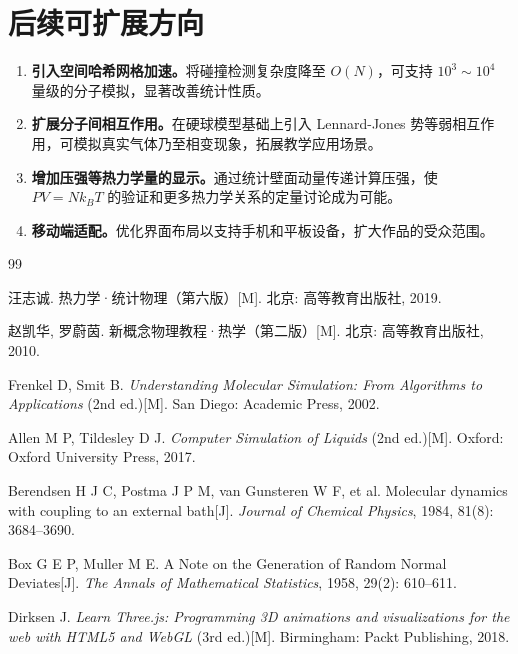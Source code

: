 \documentclass[zihao=-4,a4paper,oneside]{ctexbook}
\newcommand{\kb}{k_{\!B}}
\begin{document}
\section{后续可扩展方向}

\begin{enumerate}
  \item \textbf{引入空间哈希网格加速。}将碰撞检测复杂度降至 $O(N)$，可支持 $10^3\sim 10^4$ 量级的分子模拟，显著改善统计性质。
  \item \textbf{扩展分子间相互作用。}在硬球模型基础上引入 Lennard-Jones 势等弱相互作用，可模拟真实气体乃至相变现象，拓展教学应用场景。
  \item \textbf{增加压强等热力学量的显示。}通过统计壁面动量传递计算压强，使 $PV=N\kb T$ 的验证和更多热力学关系的定量讨论成为可能。
  \item \textbf{移动端适配。}优化界面布局以支持手机和平板设备，扩大作品的受众范围。
\end{enumerate}

\begin{thebibliography}{99}

 汪志诚. 热力学·统计物理（第六版）[M]. 北京: 高等教育出版社, 2019.

 赵凯华, 罗蔚茵. 新概念物理教程·热学（第二版）[M]. 北京: 高等教育出版社, 2010.

 Frenkel D, Smit B. \textit{Understanding Molecular Simulation: From Algorithms to Applications} (2nd ed.)[M]. San Diego: Academic Press, 2002.

 Allen M P, Tildesley D J. \textit{Computer Simulation of Liquids} (2nd ed.)[M]. Oxford: Oxford University Press, 2017.

 Berendsen H J C, Postma J P M, van Gunsteren W F, et al. Molecular dynamics with coupling to an external bath[J]. \textit{Journal of Chemical Physics}, 1984, 81(8): 3684--3690.

 Box G E P, Muller M E. A Note on the Generation of Random Normal Deviates[J]. \textit{The Annals of Mathematical Statistics}, 1958, 29(2): 610--611.

 Dirksen J. \textit{Learn Three.js: Programming 3D animations and visualizations for the web with HTML5 and WebGL} (3rd ed.)[M]. Birmingham: Packt Publishing, 2018.

\end{thebibliography}
\end{document}
